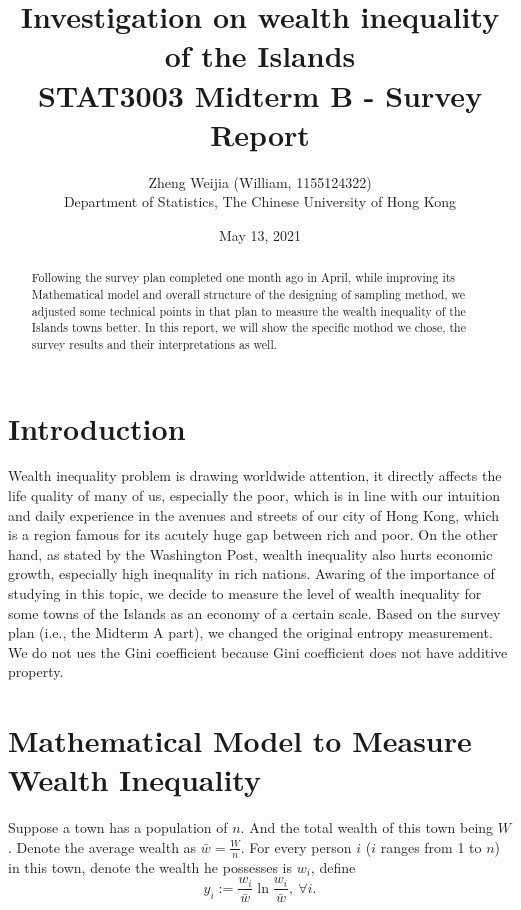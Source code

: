 \documentclass[12pt]{article}%
\begin{document}
\title{
Investigation on wealth inequality of the Islands\\
\Large STAT3003 Midterm B - Survey Report}
\author{Zheng Weijia (William, 1155124322) \\
Department of Statistics,
The Chinese University of Hong Kong}
\date{May 13, 2021}
\maketitle

\begin{abstract}
    Following the survey plan completed one month ago in April, 
    while improving its Mathematical model and 
    overall structure of the designing of sampling method, 
    we adjusted some technical points in that plan 
    to measure the wealth inequality of the Islands towns better. 
    In this report, we will show the specific mothod we chose, 
    the survey results and their interpretations as well.

\end{abstract}

\section{Introduction}
Wealth inequality problem is drawing worldwide attention, 
it directly affects the life quality of many of us, especially the poor, 
which is in line with our intuition and daily experience 
in the avenues and streets of our city of Hong Kong, 
which is a region famous for its acutely huge gap between rich and poor.
On the other hand, as stated by the Washington Post, wealth inequality also
hurts economic growth, especially high inequality in rich nations. 
Awaring of the importance of studying in this topic,
we decide to measure the level of wealth inequality 
for some towns of the Islands as an economy of a certain scale. 
Based on the survey plan (i.e., the Midterm A part), 
we changed the original entropy measurement. 
We do not ues the Gini coefficient because 
Gini coefficient does not have additive property.


\section{Mathematical Model to Measure Wealth Inequality}
Suppose a town has a population of $n$. 
And the total wealth of this town being $W$. 
Denote the average wealth as $\bar{w}=\frac{W}{n}$.
For every person $i$ ($i$ ranges from 1 to $n$) in this town, 
denote the wealth he possesses is $w_i$, define 
$$y_i := \frac{w_i}{\bar{w}}\ln{ \frac{w_i}{\bar{w}} } ,~ \forall i.$$
\end{document}
